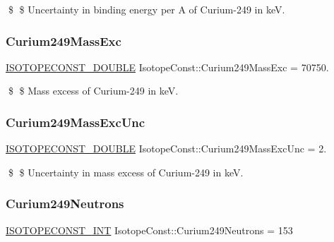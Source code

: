 \$ \$ Uncertainty in binding energy per A of Curium-\/249 in keV. \mbox{\label{group___isotope_const-_curium-_cm249_ga75b0f4beec031155580c9799ebe4565f}} 
\subsubsection{\texorpdfstring{Curium249\+Mass\+Exc}{Curium249MassExc}}
{\footnotesize\ttfamily \mbox{\hyperlink{group___isotope_const-_macros_ga8f45a7272ce02c0b4c65c44636ed719a}{I\+S\+O\+T\+O\+P\+E\+C\+O\+N\+S\+T\+\_\+\+D\+O\+U\+B\+LE}} Isotope\+Const\+::\+Curium249\+Mass\+Exc = 70750.}

\$ \$ Mass excess of Curium-\/249 in keV. \mbox{\label{group___isotope_const-_curium-_cm249_ga10ce6d435112f429bc7e6b9e3e1cf030}} 
\subsubsection{\texorpdfstring{Curium249\+Mass\+Exc\+Unc}{Curium249MassExcUnc}}
{\footnotesize\ttfamily \mbox{\hyperlink{group___isotope_const-_macros_ga8f45a7272ce02c0b4c65c44636ed719a}{I\+S\+O\+T\+O\+P\+E\+C\+O\+N\+S\+T\+\_\+\+D\+O\+U\+B\+LE}} Isotope\+Const\+::\+Curium249\+Mass\+Exc\+Unc = 2.}

\$ \$ Uncertainty in mass excess of Curium-\/249 in keV. \mbox{\label{group___isotope_const-_curium-_cm249_gaf093c22f0fdc8d87c691b7add8e28bb1}} 
\subsubsection{\texorpdfstring{Curium249\+Neutrons}{Curium249Neutrons}}
{\footnotesize\ttfamily \mbox{\hyperlink{group___isotope_const-_macros_ga5f18360b3e99483a35c32d789e62621c}{I\+S\+O\+T\+O\+P\+E\+C\+O\+N\+S\+T\+\_\+\+I\+NT}} Isotope\+Const\+::\+Curium249\+Neutrons = 153}

